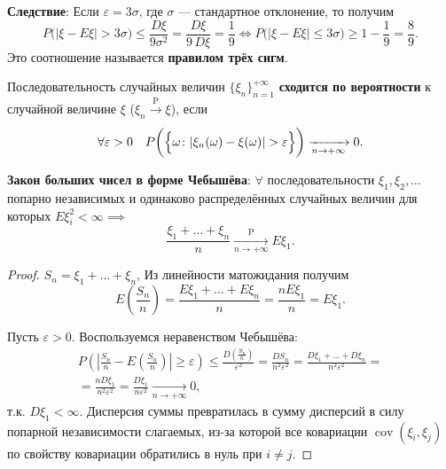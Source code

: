 \textbf{Следствие}:
Если $\varepsilon = 3\sigma$, где $\sigma$ --- стандартное отклонение, то получим
\begin{equation*}
    P\bigl( |\xi-E \xi|> 3 \sigma \bigr) \leqslant 
    \frac{D \xi}{9 \sigma^2} = 
    \frac{D \xi}{9 \, D \xi} =
    \frac{1}{9} \iff 
    P\bigl( |\xi-E \xi| \leqslant 3 \sigma \bigr) \geqslant 
    1-\frac{1}{9} = 
    \frac{8}{9}.
\end{equation*}
Это соотношение называется \textbf{правилом трёх сигм}.

Последовательность случайных величин $\{\xi_n\}_{n = 1}^{+\infty}$ 
\textbf{сходится по вероятности} к случайной величине $\xi$ ($\xi_n \xrightarrow[]{\text{P}} \xi$), если
$$
    \forall \varepsilon>0 \quad P \biggl( \Bigl\{ \omega \colon |\xi_{n}(\omega)-\xi(\omega)|>\varepsilon \Bigr\} \biggr) \xrightarrow[n \to +\infty]{} 0.
$$

\textbf{Закон больших чисел в форме Чебышёва}:
$\forall$ последовательности $\xi_1, \xi_2, \ldots$ попарно независимых и одинаково распределённых случайных величин для которых $E \xi_i^2 < \infty \implies$ 
\begin{equation*}
    \frac{\xi_{1}+\ldots+\xi_{n}}{n} \xrightarrow[n \to + \infty]{\text{P}} E \xi_{1}.
\end{equation*}


\begin{proof}
    $S_n = \xi_1 + \ldots + \xi_n$, Из линейности матожидания получим
    \begin{equation*}
        E \left(\frac{S_{n}}{n}\right)=\frac{E \xi_{1}+\ldots+E \xi_{n}}{n}=\frac{n E \xi_{1}}{n}=E \xi_{1}.
    \end{equation*}
    
    Пусть $\varepsilon > 0$. Воспользуемся неравенством Чебышёва:
    \begin{multline*}
        P\left(\left|\frac{S_{n}}{n}-E \left(\frac{S_{n}}{n}\right)\right| \geqslant \varepsilon\right) \leqslant \frac{D\left(\frac{S_{n}}{n}\right)}{\varepsilon^{2}}
        = \frac{D S_{n}}{n^{2} \varepsilon^{2}}
        = \frac{D \xi_{1}+\ldots+D \xi_{n}}{n^{2} \varepsilon^{2}}= \\
        = \frac{n D \xi_{1}}{n^{2} \varepsilon^{2}}
        = \frac{D \xi_{1}}{n \varepsilon^{2}} \xrightarrow[n \to +\infty]{} 0,
    \end{multline*}
    т.к. $D\xi_1 < \infty$. Дисперсия суммы превратилась в сумму дисперсий в силу попарной независимости слагаемых, из-за которой все ковариации $\operatorname{cov}(\xi_i, \xi_j)$ по свойству ковариации обратились в нуль при $i \neq j$.
\end{proof}



